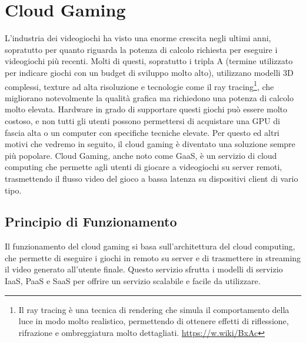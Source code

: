 \documentclass[12pt,a4paper,openright,twoside]{book}
\begin{document}
\section{Cloud Gaming}
\label{sec:cloud-gaming}
L'industria dei videogiochi ha visto una enorme crescita negli ultimi anni, sopratutto per quanto riguarda la potenza di calcolo richiesta per eseguire i videogiochi più recenti. Molti di questi, sopratutto i tripla A (termine utilizzato per indicare giochi con un budget di sviluppo molto alto), utilizzano modelli 3D complessi, texture ad alta risoluzione e tecnologie come il ray tracing\footnote{Il ray tracing è una tecnica di rendering che simula il comportamento della luce in modo molto realistico, permettendo di ottenere effetti di riflessione, rifrazione e ombreggiatura molto dettagliati. \url{https://w.wiki/BxAc}}, che migliorano notevolmente la qualità grafica ma richiedono una potenza di calcolo molto elevata.
Hardware in grado di supportare questi giochi può essere molto costoso, e non tutti gli utenti possono permettersi di acquistare una GPU di fascia alta o un computer con specifiche tecniche elevate.
Per questo ed altri motivi che vedremo in seguito, il cloud gaming è diventato una soluzione sempre più popolare.
Cloud Gaming, anche noto come \ac{GaaS}, è un servizio di cloud computing che permette agli utenti di giocare a videogiochi su server remoti, trasmettendo il flusso video del gioco a bassa latenza su dispositivi client di vario tipo. \cite{HARLE2023}

\subsection{Principio di Funzionamento}
\label{subsec:funzionamento}

Il funzionamento del cloud gaming si basa sull'architettura del cloud computing, che permette di eseguire i giochi in remoto su server e di trasmettere in streaming il video generato all'utente finale. Questo servizio sfrutta i modelli di servizio \ac{IaaS}, PaaS e SaaS per offrire un servizio scalabile e facile da utilizzare.
\end{document}
